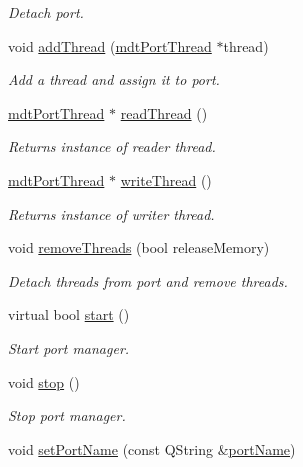 \begin{DoxyCompactItemize}
\begin{DoxyCompactList}\small\item\em Detach port. \end{DoxyCompactList}\item 
void \hyperlink{classmdt_port_manager_ab62591409d019a4a2576b4310c411b8f}{add\-Thread} (\hyperlink{classmdt_port_thread}{mdt\-Port\-Thread} $\ast$thread)
\begin{DoxyCompactList}\small\item\em Add a thread and assign it to port. \end{DoxyCompactList}\item 
\hyperlink{classmdt_port_thread}{mdt\-Port\-Thread} $\ast$ \hyperlink{classmdt_port_manager_ad9233b5156a45f2684783317d75fdf9b}{read\-Thread} ()
\begin{DoxyCompactList}\small\item\em Returns instance of reader thread. \end{DoxyCompactList}\item 
\hyperlink{classmdt_port_thread}{mdt\-Port\-Thread} $\ast$ \hyperlink{classmdt_port_manager_af44b6e9876e6687b1d4fe7e05ffd5a91}{write\-Thread} ()
\begin{DoxyCompactList}\small\item\em Returns instance of writer thread. \end{DoxyCompactList}\item 
void \hyperlink{classmdt_port_manager_aaa0a474183bcae0fff4fb9ef43023c25}{remove\-Threads} (bool release\-Memory)
\begin{DoxyCompactList}\small\item\em Detach threads from port and remove threads. \end{DoxyCompactList}\item 
virtual bool \hyperlink{classmdt_port_manager_af1fb103ffafc227337a59c7e82f44fbc}{start} ()
\begin{DoxyCompactList}\small\item\em Start port manager. \end{DoxyCompactList}\item 
void \hyperlink{classmdt_port_manager_aacbf87cc3d9c37c87e21696f8a6514bd}{stop} ()
\begin{DoxyCompactList}\small\item\em Stop port manager. \end{DoxyCompactList}\item 
void \hyperlink{classmdt_port_manager_a2b2ed690cbba9f544c6ac1b46684e59a}{set\-Port\-Name} (const Q\-String \&\hyperlink{classmdt_port_manager_af4fcab6aaad98d74aeabfc972da1d406}{port\-Name})

\end{DoxyCompactItemize}
